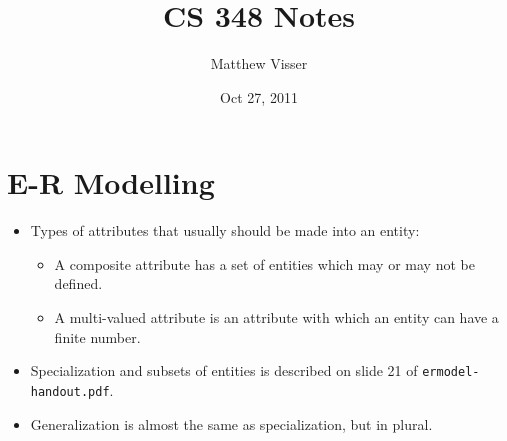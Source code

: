 \documentclass[12pt]{article}
\begin{document}
\title{CS 348 Notes}
\author{Matthew Visser}
\date{Oct 27, 2011}
\maketitle

\section{E-R Modelling}

\begin{itemize}
	\item Types of attributes that usually should be made into an entity:
		\begin{itemize}
			\item A composite attribute has a set of entities which may or may not be
				defined.
			\item A multi-valued attribute is an attribute with which an entity can have
				a finite number.
		\end{itemize}
	\item Specialization and subsets of entities is described on slide 21 of
		\texttt{ermodel-handout.pdf}.
	\item Generalization is almost the same as specialization, but in plural.
\end{itemize}
\end{document}
